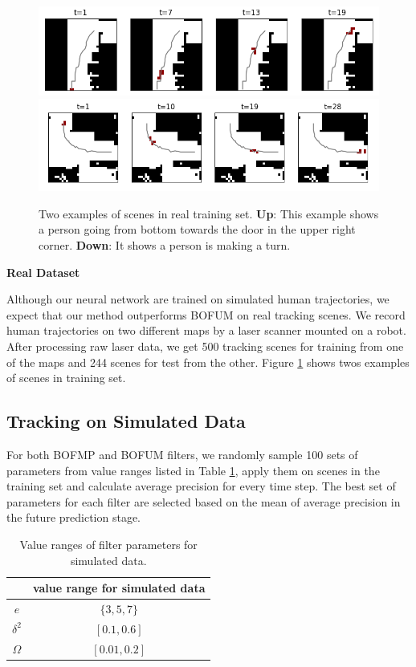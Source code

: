 \begin{figure}[hp]
    \includegraphics[width=.98\textwidth]{figures/real_dataset_1_persons_1_crop.png}
    \includegraphics[width=\textwidth]{figures/real_dataset_1_persons_crop.png}
    \caption[Two examples of scenes in real training set.]{Two examples of scenes in real training set. \textbf{Up}: This example shows a person going from bottom towards the door in the upper right corner. \textbf{Down}: It shows a person is making a turn. }
    \label{fig:sample_scene_real}


\end{figure}


\textbf{Real Dataset}

Although our neural network are trained on simulated human trajectories, we expect that our method outperforms BOFUM on real tracking scenes. We record human trajectories on two different maps by a laser scanner mounted on a robot. After processing raw laser data, we get 500 tracking scenes for training from one of the maps and 244 scenes for test from the other. Figure \ref{fig:sample_scene_real} shows twos examples of scenes in training set.

\subsection{Tracking on Simulated Data}

For both BOFMP and BOFUM filters, we randomly sample 100 sets of parameters from value ranges listed in Table \ref{table:param_range_simulated}, apply them on scenes in the training set and calculate average precision for every time step. The best set of parameters for each filter are selected based on the mean of average precision in the future prediction stage. 

\begin{table}[H]
\centering
  \begin{tabular}{c|c}
    \hline
     &   value range for simulated data \\ \hline
    \( e \) & \( \{3, 5, 7\} \) \\
    \(  \delta^2\) & \( [0.1, 0.6]\) \\   
   \( \Omega \) & \( [0.01, 0.2] \) \\
   \hline
 \end{tabular}
\caption{Value ranges of filter parameters for simulated data.}
\label{table:param_range_simulated}
\end{table}

